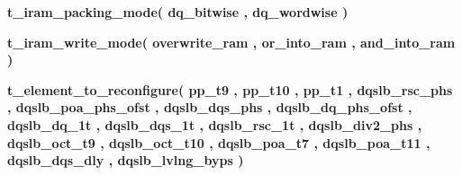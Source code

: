 \begin{DoxyCompactItemize}
{\bfseries {\bf t\+\_\+iram\+\_\+packing\+\_\+mode}{\bfseries \textcolor{vhdlchar}{(}\textcolor{vhdlchar}{ }\textcolor{vhdlchar}{dq\+\_\+bitwise}\textcolor{vhdlchar}{ }\textcolor{vhdlchar}{,}\textcolor{vhdlchar}{ }\textcolor{vhdlchar}{dq\+\_\+wordwise}\textcolor{vhdlchar}{ }\textcolor{vhdlchar}{)}\textcolor{vhdlchar}{ }}} 
\item 
{\bfseries {\bf t\+\_\+iram\+\_\+write\+\_\+mode}{\bfseries \textcolor{vhdlchar}{(}\textcolor{vhdlchar}{ }\textcolor{vhdlchar}{overwrite\+\_\+ram}\textcolor{vhdlchar}{ }\textcolor{vhdlchar}{,}\textcolor{vhdlchar}{ }\textcolor{vhdlchar}{or\+\_\+into\+\_\+ram}\textcolor{vhdlchar}{ }\textcolor{vhdlchar}{,}\textcolor{vhdlchar}{ }\textcolor{vhdlchar}{and\+\_\+into\+\_\+ram}\textcolor{vhdlchar}{ }\textcolor{vhdlchar}{)}\textcolor{vhdlchar}{ }}} 
\item 
{\bfseries {\bf t\+\_\+element\+\_\+to\+\_\+reconfigure}{\bfseries \textcolor{vhdlchar}{(}\textcolor{vhdlchar}{ }\textcolor{vhdlchar}{pp\+\_\+t9}\textcolor{vhdlchar}{ }\textcolor{vhdlchar}{,}\textcolor{vhdlchar}{ }\textcolor{vhdlchar}{pp\+\_\+t10}\textcolor{vhdlchar}{ }\textcolor{vhdlchar}{,}\textcolor{vhdlchar}{ }\textcolor{vhdlchar}{pp\+\_\+t1}\textcolor{vhdlchar}{ }\textcolor{vhdlchar}{,}\textcolor{vhdlchar}{ }\textcolor{vhdlchar}{dqslb\+\_\+rsc\+\_\+phs}\textcolor{vhdlchar}{ }\textcolor{vhdlchar}{,}\textcolor{vhdlchar}{ }\textcolor{vhdlchar}{dqslb\+\_\+poa\+\_\+phs\+\_\+ofst}\textcolor{vhdlchar}{ }\textcolor{vhdlchar}{,}\textcolor{vhdlchar}{ }\textcolor{vhdlchar}{dqslb\+\_\+dqs\+\_\+phs}\textcolor{vhdlchar}{ }\textcolor{vhdlchar}{,}\textcolor{vhdlchar}{ }\textcolor{vhdlchar}{dqslb\+\_\+dq\+\_\+phs\+\_\+ofst}\textcolor{vhdlchar}{ }\textcolor{vhdlchar}{,}\textcolor{vhdlchar}{ }\textcolor{vhdlchar}{dqslb\+\_\+dq\+\_\+1t}\textcolor{vhdlchar}{ }\textcolor{vhdlchar}{,}\textcolor{vhdlchar}{ }\textcolor{vhdlchar}{dqslb\+\_\+dqs\+\_\+1t}\textcolor{vhdlchar}{ }\textcolor{vhdlchar}{,}\textcolor{vhdlchar}{ }\textcolor{vhdlchar}{dqslb\+\_\+rsc\+\_\+1t}\textcolor{vhdlchar}{ }\textcolor{vhdlchar}{,}\textcolor{vhdlchar}{ }\textcolor{vhdlchar}{dqslb\+\_\+div2\+\_\+phs}\textcolor{vhdlchar}{ }\textcolor{vhdlchar}{,}\textcolor{vhdlchar}{ }\textcolor{vhdlchar}{dqslb\+\_\+oct\+\_\+t9}\textcolor{vhdlchar}{ }\textcolor{vhdlchar}{,}\textcolor{vhdlchar}{ }\textcolor{vhdlchar}{dqslb\+\_\+oct\+\_\+t10}\textcolor{vhdlchar}{ }\textcolor{vhdlchar}{,}\textcolor{vhdlchar}{ }\textcolor{vhdlchar}{dqslb\+\_\+poa\+\_\+t7}\textcolor{vhdlchar}{ }\textcolor{vhdlchar}{,}\textcolor{vhdlchar}{ }\textcolor{vhdlchar}{dqslb\+\_\+poa\+\_\+t11}\textcolor{vhdlchar}{ }\textcolor{vhdlchar}{,}\textcolor{vhdlchar}{ }\textcolor{vhdlchar}{dqslb\+\_\+dqs\+\_\+dly}\textcolor{vhdlchar}{ }\textcolor{vhdlchar}{,}\textcolor{vhdlchar}{ }\textcolor{vhdlchar}{dqslb\+\_\+lvlng\+\_\+byps}\textcolor{vhdlchar}{ }\textcolor{vhdlchar}{)}\textcolor{vhdlchar}{ }}} 

\end{DoxyCompactItemize}
